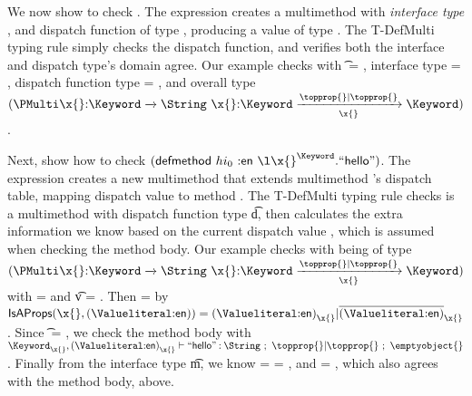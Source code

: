 We now show to check
{\createmultiexp {\ArrowTwo{\x{}}{\Keyword}{\String}} {\abs{\x{}}{\Keyword}{\x{}}}}.
%
The expression {\createmultiexp {\s{}} {\e{}}} creates a multimethod with \emph{interface type} \s{}, and dispatch function \e{}
of type \sp{},
producing a value of type
{\MultiFntype {\s{}} {\sp{}}}. %
The T-DefMulti typing rule simply checks the dispatch function, and
verifies both the interface and dispatch type's domain agree.
Our example checks with \t{} = \Keyword, interface type \s{} = {\ArrowTwo{\x{}}{\Keyword}{\String}},
dispatch function type \sp{} = {\ArrowOne{\x{}}{\Keyword}{\Keyword}{\filterset{\topprop{}}{\topprop{}}}{\x{}}}, and overall type
$
{\MultiFntype {\ArrowTwo{\x{}}{\Keyword}{\String}}
              {\ArrowOne{\x{}}{\Keyword}{\Keyword}{\filterset{\topprop{}}{\topprop{}}}{\x{}}}}
$.

Next, show how to check
$
{\extendmultiexp {hi_0} {\makekw{en}} {\abs {\x{}} {\Keyword} {\makestr{hello}}}}
$.
%
The expression 
{ {} {}} creates a new multimethod
that extends multimethod 's dispatch table, mapping dispatch value
 to method . The T-DefMulti typing rule
checks  is a multimethod with dispatch function type \t{d},
then calculates the extra information we know based on the current
dispatch value {\thenprop{\proppp{}}}, which is assumed when checking the method
body.
Our example checks with  being of type
$
{\MultiFntype {\ArrowTwo{\x{}}{\Keyword}{\String}}
              {\ArrowOne{\x{}}{\Keyword}{\Keyword}{\filterset{\topprop{}}{\topprop{}}}{\x{}}}}
$
with \objectp{} = {\x{}} and \t{v} = . Then {\thenprop{\proppp{}}} = 
{} by
$
\isacompare{}{\x{}}{\Value{\makekw{en}}}
{\filterset {\isprop {\Value{\makekw{en}}}{\x{}}}{\notprop{\Value{\makekw{en}}}{\x{}}}}
$.
Since \t{} = \Keyword{}, we check the method body with
$
\judgement{{\isprop{\Keyword}{\x{}}},{\isprop {\Value{\makekw{en}}}{\x{}}}}
  {\makestr{hello}}
  {\String}{\filterset{\topprop{}}{\topprop{}}}{\emptyobject{}}
$.
Finally from the interface type \t{m}, we know \thenprop{\prop{}} = \elseprop{\prop{}} = \topprop{},
and \object{} = \emptyobject{}, which also agrees with the method body, above.


